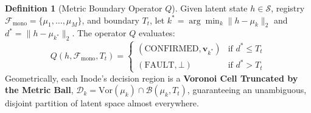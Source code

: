 \documentclass[10pt,twocolumn]{article}
\theoremstyle{definition}
\newtheorem{definition}{Definition}
\begin{document}
\begin{definition}[Metric Boundary Operator $Q$]
Given latent state $h \in \mathcal{S}$, registry $\mathcal{F}_{\mathrm{mono}} = \{\mu_1, \dots, \mu_M\}$, and boundary $T_t$, let $k^* = \arg\min_k \|h - \mu_k\|_2$ and $d^* = \|h - \mu_{k^*}\|_2$. The operator $Q$ evaluates:
\begin{equation}
    Q(h, \mathcal{F}_{\mathrm{mono}}, T_t) = 
    \begin{cases} 
      (\mathrm{CONFIRMED}, \mathbf{v}_{k^*}) & \text{if } d^* \le T_t \\ 
      (\mathrm{FAULT}, \bot) & \text{if } d^* > T_t 
    \end{cases}
\end{equation}
Geometrically, each Inode's decision region is a \textbf{Voronoi Cell Truncated by the Metric Ball}, $\mathcal{D}_k = \mathrm{Vor}(\mu_k) \cap \mathcal{B}(\mu_k, T_t)$, guaranteeing an unambiguous, disjoint partition of latent space almost everywhere.
\end{definition}
\end{document}
